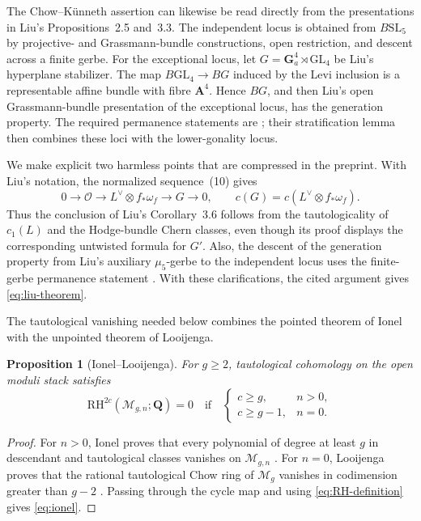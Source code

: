 \documentclass[12pt,reqno]{amsart}
\newcommand{\Q}{\mathbf{Q}}
\newcommand{\M}{\mathcal{M}}
\newcommand{\RH}{\mathrm{RH}}
\newtheorem{proposition}[theorem]{Proposition}
\theoremstyle{definition}
\theoremstyle{remark}
\begin{document}
The Chow--K\"unneth assertion can likewise be read directly from the
presentations in Liu's Propositions~2.5 and~3.3.  The independent locus is
obtained from $B\mathrm{SL}_5$ by projective- and Grassmann-bundle
constructions, open restriction, and descent across a finite gerbe.  For
the exceptional locus, let
$G=\mathbf G_a^4\rtimes\mathrm{GL}_4$ be Liu's hyperplane stabilizer.  The
map $B\mathrm{GL}_4\to BG$ induced by the Levi inclusion is a representable
affine bundle with fibre $\mathbf A^4$.  Hence $BG$, and then Liu's open
Grassmann-bundle presentation of the exceptional locus, has the generation
property.  The required permanence statements are
\cite[Lemmas~3.3--3.8]{CanningLarsonStable}; their stratification lemma then
combines these loci with the lower-gonality locus.

We make explicit two harmless points that are compressed in the preprint.
With Liu's notation, the normalized sequence~(10) gives
\[
 0\longrightarrow\mathcal O
 \longrightarrow L^\vee\otimes f_*\omega_f
 \longrightarrow G\longrightarrow0,
 \qquad
 c(G)=c(L^\vee\otimes f_*\omega_f).
\]
Thus the conclusion of Liu's Corollary~3.6 follows from the tautologicality
of $c_1(L)$ and the Hodge-bundle Chern classes, even though its proof
displays the corresponding untwisted formula for $G'$.  Also, the descent
of the generation property from Liu's auxiliary $\mu_5$-gerbe to the
independent locus uses the finite-gerbe permanence statement
\cite[Lemma~3.6]{CanningLarsonStable}.  With these clarifications, the cited
argument gives \eqref{eq:liu-theorem}.

The tautological vanishing needed below combines the pointed theorem of
Ionel with the unpointed theorem of Looijenga.

\begin{proposition}[Ionel--Looijenga]\label{prop:ionel}
For $g\geq2$, tautological cohomology on the open moduli stack satisfies
\begin{equation}\label{eq:ionel}
 \RH^{2c}(\M_{g,n};\Q)=0
 \quad\text{if}\quad
 \begin{cases}
 c\geq g,&n>0,\\
 c\geq g-1,&n=0.
 \end{cases}
\end{equation}
\end{proposition}

\begin{proof}
For $n>0$, Ionel proves that every polynomial of degree at least $g$ in
descendant and tautological classes vanishes on $\M_{g,n}$
\cite[Theorem~0.1]{Ionel}.  For $n=0$, Looijenga proves that the rational
tautological Chow ring of $\M_g$ vanishes in codimension greater than
$g-2$ \cite[Theorem~1.1]{Looijenga}.  Passing through the cycle map and
using \eqref{eq:RH-definition} gives \eqref{eq:ionel}.
\end{proof}
\end{document}
